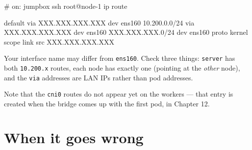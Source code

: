 \documentclass[11pt,oneside]{report}
\begin{document}
\begin{cmdlst}
# on: jumpbox
ssh root@node-1 ip route
\end{cmdlst}

\begin{outlst}
default via XXX.XXX.XXX.XXX dev ens160 
10.200.0.0/24 via XXX.XXX.XXX.XXX dev ens160 
XXX.XXX.XXX.0/24 dev ens160 proto kernel scope link src XXX.XXX.XXX.XXX 
\end{outlst}

Your interface name
may differ from
\texttt{ens160}.
Check three things:
\texttt{server} has
both
\texttt{10.200.x}
routes, each node
has exactly one
(pointing at the
\emph{other} node),
and the \texttt{via}
addresses are LAN
IPs rather than pod
addresses.

Note that the
\texttt{cni0} routes
do not appear yet on
the workers --- that
entry is created
when the bridge
comes up with the
first pod, in
Chapter 12.

\hypertarget{when-it-goes-wrong-10}{%
\section{When it
goes
wrong}\label{when-it-goes-wrong-10}}
\end{document}
